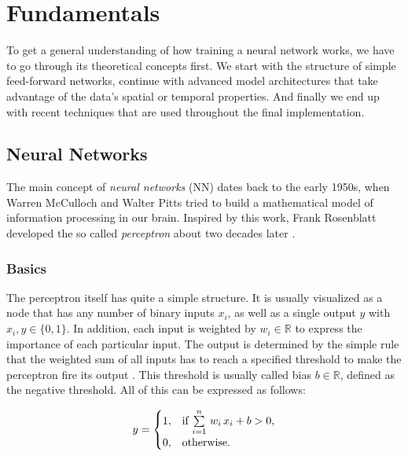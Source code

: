 

\chapter{Fundamentals} \label{chapter:fundamentals}

To get a general understanding of how training a neural network works, we have to go through its theoretical concepts first. We start with the structure of simple feed-forward networks, continue with advanced model architectures that take advantage of the data's spatial or temporal properties. And finally we end up with recent techniques that are used throughout the final implementation.


\section{Neural Networks}

The main concept of \textit{neural networks} (NN) dates back to the early 1950s, when Warren McCulloch and Walter Pitts tried to build a mathematical model of information processing in our brain. Inspired by this work, Frank Rosenblatt developed the so called \textit{perceptron} about two decades later \parencite[p. 226]{pattern_and_ml}. 

\subsection{Basics}

The perceptron itself has quite a simple structure. It is usually visualized as a node that has any number of binary inputs $ x_{i} $, as well as a single output $ y $ with $ x_{i}, y \in \{0, 1\} $. In addition, each input is weighted by $ w_{i} \in \mathbb{R} $ to express the importance of each particular input. The output is determined by the simple rule that the weighted sum of all inputs has to reach a specified threshold to make the perceptron fire its output \parencite{neural_nets_deep_learning}. This threshold is usually called bias $ b \in \mathbb{R} $, defined as the negative threshold. All of this can be expressed as follows:

\begin{equation} \label{eq:mlp}
  y = \begin{cases}
    1, & \text{if $ \sum\limits_{i=1}^n \, w_{i} \, x_{i} + b > 0$},\\
    0, & \text{otherwise}.
  \end{cases}
\end{equation}

